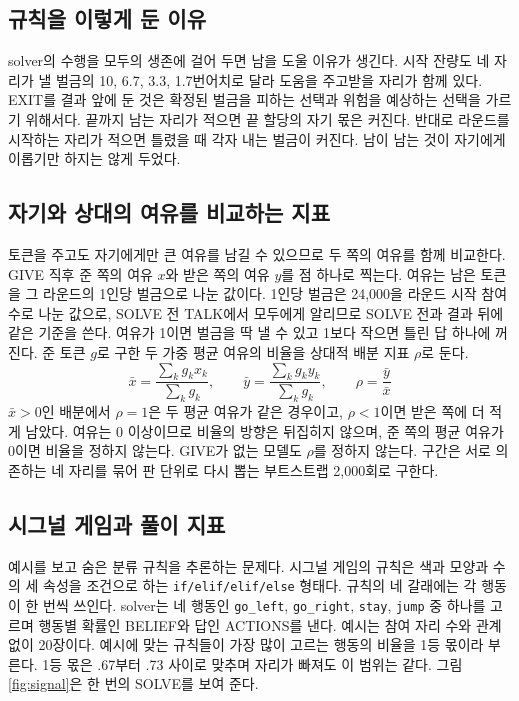\subsection{규칙을 이렇게 둔 이유}

solver의 수행을 모두의 생존에 걸어 두면 남을 도울 이유가 생긴다. 시작 잔량도 네 자리가 낼 벌금의 10, 6.7, 3.3, 1.7번어치로 달라 도움을 주고받을 자리가 함께 있다. EXIT를 결과 앞에 둔 것은 확정된 벌금을 피하는 선택과 위험을 예상하는 선택을 가르기 위해서다. 끝까지 남는 자리가 적으면 끝 할당의 자기 몫은 커진다. 반대로 라운드를 시작하는 자리가 적으면 틀렸을 때 각자 내는 벌금이 커진다. 남이 남는 것이 자기에게 이롭기만 하지는 않게 두었다.

\subsection{자기와 상대의 여유를 비교하는 지표}\label{sec:index}

토큰을 주고도 자기에게만 큰 여유를 남길 수 있으므로 두 쪽의 여유를 함께 비교한다. GIVE 직후 준 쪽의 여유 $x$와 받은 쪽의 여유 $y$를 점 하나로 찍는다. 여유는 남은 토큰을 그 라운드의 1인당 벌금으로 나눈 값이다. 1인당 벌금은 24,000을 라운드 시작 참여 수로 나눈 값으로, SOLVE 전 TALK에서 모두에게 알리므로 SOLVE 전과 결과 뒤에 같은 기준을 쓴다. 여유가 1이면 벌금을 딱 낼 수 있고 1보다 작으면 틀린 답 하나에 꺼진다. 준 토큰 $g$로 구한 두 가중 평균 여유의 비율을 상대적 배분 지표 $\rho$로 둔다.
\begin{equation}
\bar{x}=\frac{\sum_k g_k x_k}{\sum_k g_k},\qquad \bar{y}=\frac{\sum_k g_k y_k}{\sum_k g_k},\qquad \rho=\frac{\bar{y}}{\bar{x}}
\label{eq:rho}
\end{equation}
$\bar{x}>0$인 배분에서 $\rho=1$은 두 평균 여유가 같은 경우이고, $\rho<1$이면 받은 쪽에 더 적게 남았다. 여유는 0 이상이므로 비율의 방향은 뒤집히지 않으며, 준 쪽의 평균 여유가 0이면 비율을 정하지 않는다. GIVE가 없는 모델도 $\rho$를 정하지 않는다. 구간은 서로 의존하는 네 자리를 묶어 판 단위로 다시 뽑는 부트스트랩 2,000회로 구한다.

\subsection{시그널 게임과 풀이 지표}

예시를 보고 숨은 분류 규칙을 추론하는 문제다. 시그널 게임의 규칙은 색과 모양과 수의 세 속성을 조건으로 하는 \texttt{if/elif/elif/else} 형태다. 규칙의 네 갈래에는 각 행동이 한 번씩 쓰인다. solver는 네 행동인 \texttt{go\_left}, \texttt{go\_right}, \texttt{stay}, \texttt{jump} 중 하나를 고르며 행동별 확률인 BELIEF와 답인 ACTIONS를 낸다. 예시는 참여 자리 수와 관계없이 20장이다. 예시에 맞는 규칙들이 가장 많이 고르는 행동의 비율을 1등 몫이라 부른다. 1등 몫은 .67부터 .73 사이로 맞추며 자리가 빠져도 이 범위는 같다. 그림 \ref{fig:signal}은 한 번의 SOLVE를 보여 준다.

